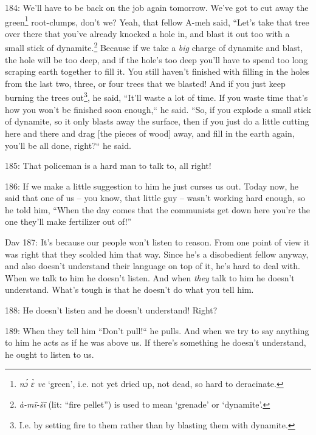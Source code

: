 184: We'll have to be back on the job again tomorrow. We've got to cut away the
green\footnote{\textit{nɔ́ ɛ̀ ve} `green', i.e. not yet dried up, not dead, so hard to deracinate.} root-clumps, don't we? Yeah, that fellow A-meh said, ``Let's
take that tree over there that you've already knocked a hole in, and blast it out
too with a small stick of dynamite.\footnote{\textit{à-mī-šī } (lit: ``fire pellet'') is used to mean `grenade' or `dynamite'.} Because if we take a \textit{big} charge
of dynamite and blast, the hole will be too deep, and if the hole's too deep you'll
have to spend too long scraping earth together to fill it. You still haven't finished
with filling in the holes from the last two, three, or four trees that we blasted!
And if you just keep burning the trees out\footnote{I.e. by setting fire to them rather than by blasting them with dynamite.}, he said, ``It'll waste a lot of
time. If you waste time that's how you won't be finished soon enough,``
he said. ``So, if you explode a small stick of dynamite, so it only blasts
away the surface, then if you just do a little cutting here and there and drag
[the pieces of wood] away, and fill in the earth again, you'll be all done, right?``
he said.

185: That policeman is a hard man to talk to, all right!

186: If we make a little suggestion to him he just curses us out. Today now, he
said that one of us -- you know, that little guy -- wasn't working hard enough,
so he told him, ``When the day comes that the communists get down here you're the
one they'll make fertilizer out of!''

Dav 187: It's because our people won't listen to reason. From one point of view
it was right that they scolded him that way. Since he's a disobedient fellow anyway,
and also doesn't understand their language on top of it, he's hard to deal with.
When we talk to him he doesn't listen. And when \textit{they} talk to him he doesn't
understand. What's tough is that he doesn't do what you tell him.

188: He doesn't listen and he doesn't understand! Right?

189: When they tell him ``Don't pull!`` he pulls. And when we try
to say anything to him he acts as if he was above us. If there's something he doesn't
understand, he ought to listen to us.

